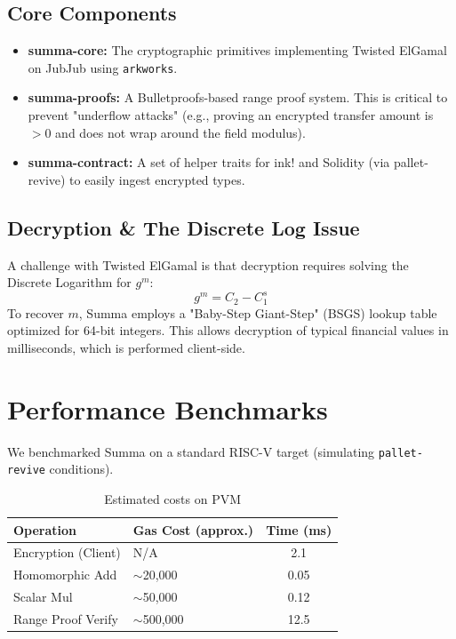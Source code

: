 \documentclass[11pt,a4paper]{article}
\begin{document}
\subsection{Core Components}
\begin{itemize}
    \item \textbf{summa-core:} The cryptographic primitives implementing Twisted ElGamal on JubJub using \texttt{arkworks}.
    \item \textbf{summa-proofs:} A Bulletproofs-based range proof system. This is critical to prevent "underflow attacks" (e.g., proving an encrypted transfer amount is $> 0$ and does not wrap around the field modulus).
    \item \textbf{summa-contract:} A set of helper traits for ink! and Solidity (via pallet-revive) to easily ingest encrypted types.
\end{itemize}

\subsection{Decryption \& The Discrete Log Issue}
A challenge with Twisted ElGamal is that decryption requires solving the Discrete Logarithm for $g^m$:
\begin{equation}
    g^m = C_2 - C_1^s
\end{equation}
To recover $m$, Summa employs a "Baby-Step Giant-Step" (BSGS) lookup table optimized for 64-bit integers. This allows decryption of typical financial values in milliseconds, which is performed client-side.

\section{Performance Benchmarks}
We benchmarked Summa on a standard RISC-V target (simulating \texttt{pallet-revive} conditions).

\begin{table}[h]
\centering
\begin{tabular}{@{}llc@{}}
\toprule
\textbf{Operation} & \textbf{Gas Cost (approx.)} & \textbf{Time (ms)} \\ \midrule
Encryption (Client) & N/A & 2.1 \\
Homomorphic Add & $\sim$20,000 & 0.05 \\
Scalar Mul & $\sim$50,000 & 0.12 \\
Range Proof Verify & $\sim$500,000 & 12.5 \\ \bottomrule
\end{tabular}
\caption{Estimated costs on PVM}
\end{table}
\end{document}
